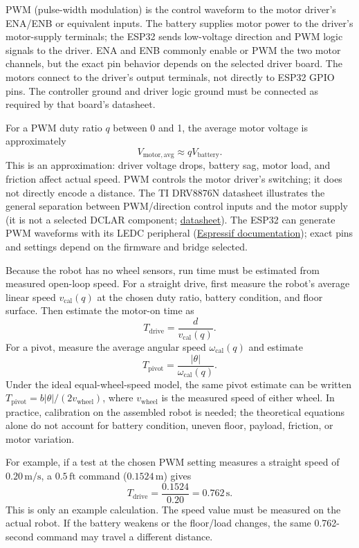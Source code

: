 \documentclass{article}
\begin{document}
PWM (pulse-width modulation) is the control waveform to the motor driver's ENA/ENB or equivalent inputs. The battery supplies motor power to the driver's motor-supply terminals; the ESP32 sends low-voltage direction and PWM logic signals to the driver. ENA and ENB commonly enable or PWM the two motor channels, but the exact pin behavior depends on the selected driver board. The motors connect to the driver's output terminals, not directly to ESP32 GPIO pins. The controller ground and driver logic ground must be connected as required by that board's datasheet.

For a PWM duty ratio $q$ between 0 and 1, the average motor voltage is approximately
\[
V_{\mathrm{motor,avg}}\approx qV_{\mathrm{battery}}.
\]
This is an approximation: driver voltage drops, battery sag, motor load, and friction affect actual speed. PWM controls the motor driver's switching; it does not directly encode a distance. The TI DRV8876N datasheet illustrates the general separation between PWM/direction control inputs and the motor supply (it is not a selected DCLAR component; \href{https://www.ti.com/lit/ds/symlink/drv8876n.pdf}{datasheet}). The ESP32 can generate PWM waveforms with its LEDC peripheral (\href{https://docs.espressif.com/projects/esp-idf/en/latest/esp32/api-reference/peripherals/ledc.html}{Espressif documentation}); exact pins and settings depend on the firmware and bridge selected.

Because the robot has no wheel sensors, run time must be estimated from measured open-loop speed. For a straight drive, first measure the robot's average linear speed $v_{\mathrm{cal}}(q)$ at the chosen duty ratio, battery condition, and floor surface. Then estimate the motor-on time as
\[
T_{\mathrm{drive}}=\frac{d}{v_{\mathrm{cal}}(q)}.
\]
For a pivot, measure the average angular speed $\omega_{\mathrm{cal}}(q)$ and estimate
\[
T_{\mathrm{pivot}}=\frac{|\theta|}{\omega_{\mathrm{cal}}(q)}.
\]
Under the ideal equal-wheel-speed model, the same pivot estimate can be written $T_{\mathrm{pivot}}=b|\theta|/(2v_{\mathrm{wheel}})$, where $v_{\mathrm{wheel}}$ is the measured speed of either wheel. In practice, calibration on the assembled robot is needed; the theoretical equations alone do not account for battery condition, uneven floor, payload, friction, or motor variation.

For example, if a test at the chosen PWM setting measures a straight speed of $0.20\,\mathrm{m/s}$, a $0.5\,\mathrm{ft}$ command ($0.1524\,\mathrm{m}$) gives
\[
T_{\mathrm{drive}}=\frac{0.1524}{0.20}=0.762\,\mathrm{s}.
\]
This is only an example calculation. The speed value must be measured on the actual robot. If the battery weakens or the floor/load changes, the same 0.762-second command may travel a different distance.
\end{document}
